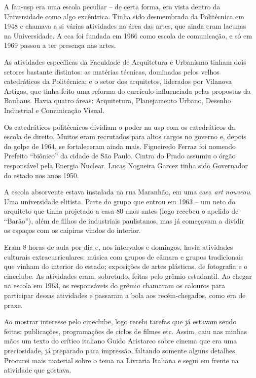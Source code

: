 A {\sc fau-usp} era uma escola peculiar -- de certa forma, era vista dentro da
Universidade como algo excêntrica. Tinha sido desmembrada da Politécnica
em 1948 e chamava a si várias atividades na área das artes, que ainda
eram lacunas na Universidade. A {\sc eca} foi fundada em 1966 como escola de
comunicação, e só em 1969 passou a ter presença nas artes.

As atividades específicas da Faculdade de Arquitetura e
Urbanismo tinham dois setores bastante distintos: as matérias técnicas,
dominadas pelos velhos catedráticos da Politécnica; e o setor dos arquitetos,
liderados por Vilanova Artigas, que tinha feito uma reforma do currículo
influenciada pelas propostas da Bauhaus. Havia quatro áreas: Arquitetura,
Planejamento Urbano, Desenho Industrial e Comunicação Visual.

Os catedráticos politécnicos dividiam o poder na {\sc usp} com os catedráticos
da escola de direito. Muitos eram recrutados para altos cargos no
governo e, depois do golpe de 1964, se fortaleceram ainda mais. Figueiredo
Ferraz foi nomeado Prefeito “biônico” da cidade de São Paulo. Cintra do
Prado assumiu o órgão responsável pela Energia Nuclear. Lucas
Nogueira Garcez tinha sido Governador do estado nos anos 1950.

A escola absorvente estava instalada na rua Maranhão, em uma casa {\it art
nouveau}. Uma universidade elitista. Parte do grupo que entrou em 1963 -- um
neto do arquiteto que tinha projetado a casa 80 anos antes (logo recebeu
o apelido de “Barão”), além de filhos de industriais paulistanos, mas já
começavam a dividir os espaços com os caipiras vindos do interior.

Eram 8 horas de aula por dia e, nos intervalos e domingos, havia atividades
culturais extracurriculares: música com grupos de câmara e grupos
tradicionais que vinham do interior do estado; exposições de artes
plásticas, de fotografia e o cineclube. As atividades eram, sobretudo,
feitas pelo grêmio estudantil. Ao chegar na escola em 1963, os
responsáveis do grêmio chamaram os calouros para participar dessas
atividades e passaram a bola aos recém-chegados, como era de praxe.

Ao mostrar interesse pelo cineclube, logo recebi tarefas que já estavam
sendo feitas: publicações, programações de ciclos de filmes etc. Assim,
caiu nas minhas mãos um texto do crítico italiano Guido Aristarco sobre
cinema que era uma preciosidade, já preparado para impressão, faltando
somente alguns detalhes. Procurei mais material sobre o tema na Livraria
Italiana e segui em frente na atividade que gostava.

